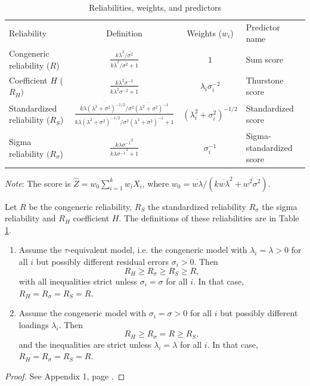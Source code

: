 \documentclass[twoside]{article}
\begin{document}
\begin{table}
\label{tab:reliabilities_}
\noindent \begin{centering}
\caption{Reliabilities, weights, and predictors}
\begin{tabular}{lccl}
\toprule
 Reliability & Definition & Weights ($w_{i}$) & Predictor name\\
 \cmidrule{1-4}
Congeneric reliability ($R$) & $\frac{k\overline{\lambda}^{2}/\overline{\sigma^{2}}}{k\overline{\lambda}^{2}/\overline{\sigma^{2}}+1}$ & $1$ & Sum score \\[2ex]
Coefficient $H$ ($R_{H})$ & $\frac{k\overline{\lambda^{2}\sigma^{-2}}}{k\overline{\lambda^{2}\sigma^{-2}}+1}$ & $\lambda_{i}\sigma_{i}^{-2}$ & Thurstone score \\[2ex]
Standardized reliability ($R_{S}$) & $\frac{k\overline{\lambda(\lambda^{2}+\sigma^{2})^{-1/2}}/\overline{\sigma^{2}(\lambda^{2}+\sigma^{2})^{-1}}}{k\overline{\lambda(\lambda^{2}+\sigma^{2})^{-1/2}}/\overline{\sigma^{2}(\lambda^{2}+\sigma^{2})^{-1}}+1}$ & $(\lambda_{i}^{2}+\sigma_{i}^{2})^{-1/2}$ & Standardized score \\[2ex]
Sigma reliability $(R_{\sigma}$) & $\frac{k\overline{\lambda\sigma^{-1}}^{2}}{k\overline{\lambda\sigma^{-1}}^{2}+1}$ & $\sigma_{i}^{-1}$ & Sigma-standardized score \\[2ex]
\bottomrule
\end{tabular}
\par\end{centering}
\vskip7.0pt
\textit{Note}: The score is $\hat{Z} = w_{0}\sum_{i=1}^{k}w_iX_{i}$, where $w_0 = \overline{w\lambda}/(k\overline{w\lambda}^{2}+\overline{w^{2}\sigma^{2}})$.
\end{table}


\begin{thm}
\label{thm:Properties of three} Let $ R$ be the congeneric
reliability, $ R_{S}$ the standardized reliability 
$ R_{\sigma}$ the sigma reliability 
and $ R_{H}$ coefficient $H$. The definitions of these reliabilities are in Table \ref{tab:reliabilities_}.

\begin{enumerate}[label=(\roman*)]
\item Assume the $\tau$-equivalent model,
i.e. the congeneric model with $\lambda_{i}=\lambda>0$ for all $i$
but possibly different residual errors $\sigma_{i}>0$. Then
\[
 R_{H}\geq R_{\sigma}\geq R_{S}\geq R,
\]
with all inequalities strict unless $\sigma_{i}=\sigma$ for all
$i$. In that case, $ R_{H} =  R_{\sigma} =  R_{S} =  R$.
\item Assume the congeneric model with $\sigma_i = \sigma > 0$ for all $i$ but possibly different loadings $\lambda_i$. Then
\[
 R_{H}\geq R_{\sigma}= R\geq R_{S},
\]
and the inequalities are strict unless $\lambda_{i}=\lambda$ for all
$i$. In that case, $ R_{H} =  R_{\sigma} =  R_{S} =  R$.

\end{enumerate}

\end{thm}
\begin{proof}
See Appendix 1, page \pageref{proof:Properties}.
\end{proof}
\end{document}
